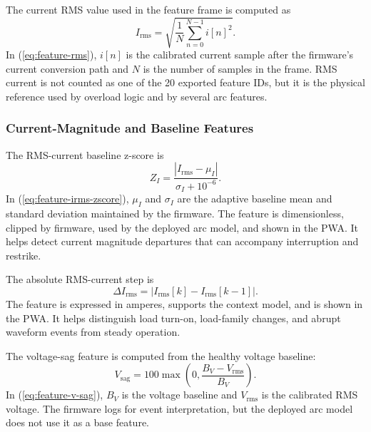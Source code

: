 The current RMS value used in the feature frame is computed as
\begin{equation}
  I_{\mathrm{rms}} =
  \sqrt{\frac{1}{N}\sum_{n=0}^{N-1} i[n]^2}.
  \label{eq:feature-rms}
\end{equation}
In (\ref{eq:feature-rms}), $i[n]$ is the calibrated current sample after the
firmware's current conversion path and $N$ is the number of samples in the
frame. RMS current is not counted as one of the 20 exported feature IDs, but
it is the physical reference used by overload logic and by several arc
features.

\subsubsection{Current-Magnitude and Baseline Features}
\label{sec:ch3-current-baseline-features}

The RMS-current baseline z-score is
\begin{equation}
  Z_I =
  \frac{|I_{\mathrm{rms}}-\mu_I|}{\sigma_I+10^{-6}} .
  \label{eq:feature-irms-zscore}
\end{equation}
In (\ref{eq:feature-irms-zscore}), $\mu_I$ and $\sigma_I$ are the adaptive
baseline mean and standard deviation maintained by the firmware. The feature
 is dimensionless, clipped by firmware,
used by the deployed arc model, and shown in the PWA. It helps detect current
magnitude departures that can accompany interruption and restrike.

The absolute RMS-current step is
\begin{equation}
  \Delta I_{\mathrm{rms}} =
  |I_{\mathrm{rms}}[k]-I_{\mathrm{rms}}[k-1]|.
  \label{eq:feature-delta-irms}
\end{equation}
The feature  is expressed in amperes, supports the
context model, and is shown in the PWA. It helps distinguish load turn-on,
load-family changes, and abrupt waveform events from steady operation.

The voltage-sag feature is computed from the healthy voltage baseline:
\begin{equation}
  V_{\mathrm{sag}} =
  100\max\left(0,\frac{B_V-V_{\mathrm{rms}}}{B_V}\right).
  \label{eq:feature-v-sag}
\end{equation}
In (\ref{eq:feature-v-sag}), $B_V$ is the voltage baseline and
$V_{\mathrm{rms}}$ is the calibrated RMS voltage. The firmware logs
 for event interpretation, but the deployed arc model does
not use it as a base feature.

